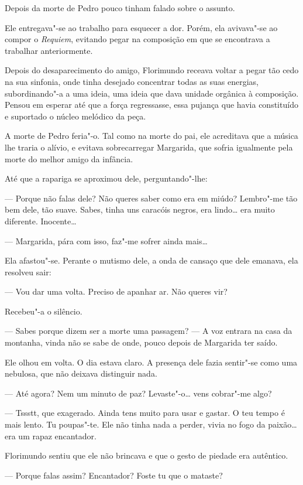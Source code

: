 Depois da morte de Pedro pouco tinham falado sobre o assunto.

Ele entregava"-se ao trabalho para esquecer a dor. Porém, ela avivava"-se
ao compor o \emph{Requiem}, evitando pegar na composição em que se
encontrava a trabalhar anteriormente.

Depois do desaparecimento do amigo, Florimundo receava voltar a pegar
tão cedo na sua sinfonia, onde tinha desejado concentrar todas as suas
energias, subordinando"-a a uma ideia, uma ideia que dava unidade
orgânica à composição. Pensou em esperar até que a força regressasse,
essa pujança que havia constituído e suportado o núcleo melódico da
peça.

A morte de Pedro feria"-o. Tal como na morte do pai, ele acreditava que a
música lhe traria o alívio, e evitava sobrecarregar Margarida, que
sofria igualmente pela morte do melhor amigo da infância.

Até que a rapariga se aproximou dele, perguntando"-lhe:

--- Porque não falas dele? Não queres saber como era em miúdo? Lembro"-me
tão bem dele, tão suave. Sabes, tinha uns caracóis negros, era
lindo\ldots{} era muito diferente. Inocente\ldots{}

--- Margarida, pára com isso, faz"-me sofrer ainda mais\ldots{}

Ela afastou"-se. Perante o mutismo dele, a onda de cansaço que dele
emanava, ela resolveu sair:

--- Vou dar uma volta. Preciso de apanhar ar. Não queres vir?

Recebeu"-a o silêncio.

--- Sabes porque dizem ser a morte uma passagem? --- A voz entrara na casa
da montanha, vinda não se sabe de onde, pouco depois de Margarida ter
saído.

Ele olhou em volta. O dia estava claro. A presença dele fazia sentir"-se
como uma nebulosa, que não deixava distinguir nada.

--- Até agora? Nem um minuto de paz? Levaste"-o\ldots{} vens cobrar"-me algo?

--- Tssstt, que exagerado. Ainda tens muito para usar e gastar. O teu
tempo é mais lento. Tu poupas"-te. Ele não tinha nada a perder, vivia no
fogo da paixão\ldots{} era um rapaz encantador.

Florimundo sentiu que ele não brincava e que o gesto de piedade era
autêntico.

--- Porque falas assim? Encantador? Foste tu que o mataste?

